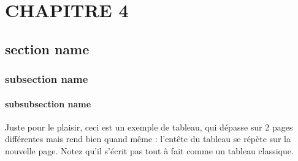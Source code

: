 \documentclass[french, a4paper, 11pt, twoside, pdftex]{StyleThese}
\begin{document}
\setcounter{chapter}{4} %
\dominitoc
\faketableofcontents
\fi

\setlength{\belowcaptionskip}{-6pt}  %
\chapter{CHAPITRE 4} \label{chap:4_ProtocolExpe}
\minitoc

\section{section name}

	\subsection{subsection name}
	\subsubsection{subsubsection name}



Juste pour le plaisir, ceci est un exemple de tableau, qui dépasse sur 2 pages différentes mais rend bien quand même : l'entête du tableau se répète sur la nouvelle page.
Notez qu'il s'écrit pas tout à fait comme un tableau classique.
\end{document}
